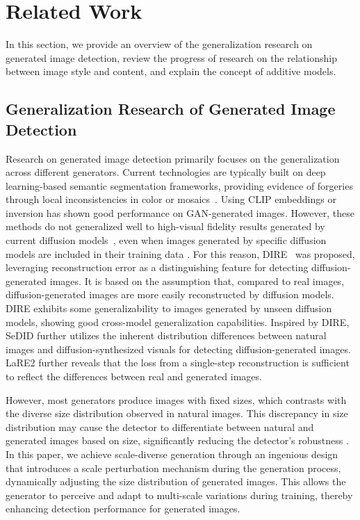 \section{Related Work}
In this section, we provide an overview of the generalization research on generated image detection, review the progress of research on the relationship between image style and content, and explain the concept of additive models.


\subsection{Generalization Research of Generated Image Detection}

Research on generated image detection primarily focuses on the generalization across different generators. Current technologies \cite{guillaro2023trufor,chen2021image, liu2022pscc} are typically built on deep learning-based semantic segmentation frameworks, providing evidence of forgeries through local inconsistencies in color or mosaics~\cite{bammey2020adaptive}.  Using CLIP embeddings \cite{ojha2023towards} or inversion \cite{wang2023dire} has shown good performance on GAN-generated images. However, these methods do not generalized well to high-visual fidelity results generated by current diffusion models~\cite{huang2025pfb,rombach2022high}, even when images generated by specific diffusion models are included in their training data \cite{cazenavette2024fakeinversion}.
For this reason, DIRE~\cite{wang2023dire} was proposed, leveraging reconstruction error as a distinguishing feature for detecting diffusion-generated images. It is based on the assumption that, compared to real images, diffusion-generated images are more easily reconstructed by diffusion models. DIRE exhibits some generalizability to images generated by unseen diffusion models, showing good cross-model generalization capabilities. Inspired by DIRE, SeDID \cite{ma2023exposing} further utilizes the inherent distribution differences between natural images and diffusion-synthesized visuals for detecting diffusion-generated images. LaRE2 \cite{luo2024lare} further reveals that the loss from a single-step reconstruction is sufficient to reflect the differences between real and generated images.

However, most generators produce images with fixed sizes, which contrasts with the diverse size distribution observed in natural images. This discrepancy in size distribution may cause the detector to differentiate between natural and generated images based on size, significantly reducing the detector's robustness \cite{grommelt2024fake}. In this paper, we achieve scale-diverse generation through an ingenious design that introduces a scale perturbation mechanism during the generation process, dynamically adjusting the size distribution of generated images. This allows the generator to perceive and adapt to multi-scale variations during training, thereby enhancing detection performance for generated images.

